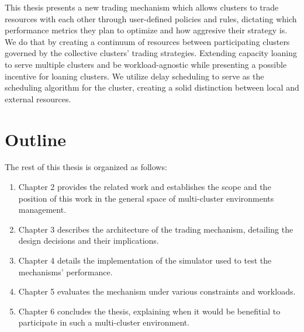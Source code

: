 This thesis presents a new trading mechanism which allows clusters to trade
resources with each other through user-defined policies and rules, dictating
which performance metrics they plan to optimize and how aggresive their
strategy is. We do that by creating a continuum of resources between
participating clusters governed by the collective clusters' trading strategies.
Extending capacity loaning to serve multiple clusters and be workload-agnostic
while presenting a possible incentive for loaning clusters. We utilize delay
scheduling to serve as the scheduling algorithm for the cluster, creating a
solid distinction between local and external resources.

\section{Outline}
The rest of this thesis is organized as follows:
\begin{enumerate}
  
  \item Chapter 2 provides the related work and establishes the scope and the
    position of this work in the general space of multi-cluster environments
    management.

  \item Chapter 3 describes the architecture of the trading mechanism,
    detailing the design decisions and their implications.  

  \item Chapter 4 details the implementation of the simulator used to test the
    mechanisms' performance.

  \item Chapter 5 evaluates the mechanism under various constraints and workloads. 

  \item Chapter 6 concludes the thesis, explaining when it would be benefitial
    to participate in such a multi-cluster environment.  

\end{enumerate}
